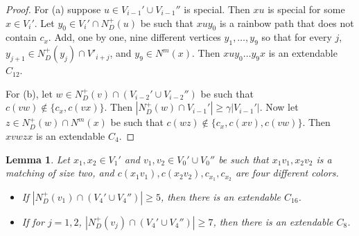 \documentclass{article}
\newtheorem{lemma}[theorem]{Lemma}
\begin{document}
\begin{proof} For (a) suppose $u\in V_{i-1}'\cup V_{i-1}''$ is special. Then $xu$ is special for some $x\in V_i'$. Let $y_0\in V_i'\cap N^+_D(u)$ be such that $xuy_0$ is a rainbow path that does not contain $c_x$. Add, one by one, nine different vertices $y_1,\dots, y_9$ so that for every $j$, $y_{j+1}\in N^+_D(y_j)\cap V'_{i+j}$, and $y_9\in N^m(x)$. Then $xuy_0\dots y_9x$ is an extendable $C_{12}$.

For (b), let $w\in N^+_D(v)\cap (V_{i-2}'\cup V_{i-2}'')$ be such that $c(vw)\notin \{c_x, c(vx)\}$. Then $|N^+_D(w)\cap V_{i-1}'|\geq \gamma |V_{i-1}'|$. Now let $z\in N^+_D(w)\cap N^m(x)$ be such that $c(wz)\notin \{c_x,c(xv), c(vw)\}$. Then $xvwzx$ is an extendable $C_4$.
 \end{proof}
\begin{lemma}\label{ext-C16-C8-lem1}
Let $x_1, x_2 \in V_1'$ and $v_1, v_2\in V_0'\cup V_0''$ be such that $x_1v_1, x_2v_2$ is a matching of size two, and  $c(x_1v_1), c(x_2v_2), c_{x_1}, c_{x_2}$ are four different colors.
\begin{itemize}
\item[(a)]  If $|N^+_D(v_1)\cap (V_{4}'\cup V_4'')|\geq 5$,  then there is an extendable $C_{16}$.
    \item[(b)] If for $j=1,2$, $|N^+_D(v_j)\cap (V_{4}'\cup V_4'')|\geq 7$,  then there is an extendable $C_8$.
    
\end{itemize}
\end{lemma}
\end{document}
